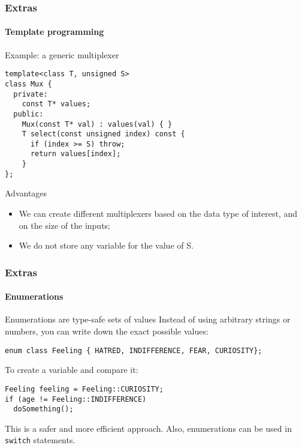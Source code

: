 \begin{frame}[fragile]
\frametitle{Extras}
\framesubtitle{Template programming}

\begin{block}{Example: a generic multiplexer}
\vspace{-1em}
{\scriptsize 
\begin{verbatim}
template<class T, unsigned S>
class Mux {
  private:
    const T* values;
  public:
    Mux(const T* val) : values(val) { }
    T select(const unsigned index) const { 
      if (index >= S) throw;
      return values[index];
    }
};
\end{verbatim}
}
\vspace{-1em}
\end{block}
\pause
\begin{block}{Advantages}
\begin{itemize}
\item We can create different multiplexers based on the data type of interest, and on the size of the inputs;
\item We do not store any variable for the value of S.
\end{itemize}
\end{block}

\end{frame}

\begin{frame}[fragile]
\frametitle{Extras}
\framesubtitle{Enumerations}

\begin{block}{Enumerations are type-safe sets of values}
Instead of using arbitrary strings or numbers, you can write down the exact possible values:

{\scriptsize 
\begin{verbatim}
enum class Feeling { HATRED, INDIFFERENCE, FEAR, CURIOSITY};
\end{verbatim}
}
\end{block}
\pause
\begin{block}{To create a variable and compare it:}

{\scriptsize 
\begin{verbatim}
Feeling feeling = Feeling::CURIOSITY;
if (age != Feeling::INDIFFERENCE)
  doSomething();
\end{verbatim}
}

This is a safer and more efficient approach. Also, enumerations can be used in \texttt{switch} statements.
\end{block}

\end{frame}

